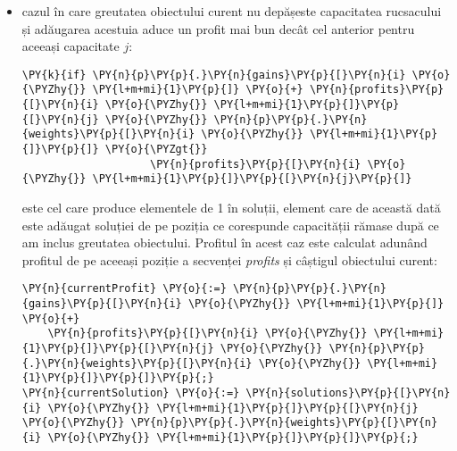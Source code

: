 \begin{sloppypar}
\begin{itemize}
        \begin{Verbatim}[commandchars=\\\{\}]
\PY{n}{currentProfit} \PY{o}{:=} \PY{n}{profits}\PY{p}{[}\PY{n}{i} \PY{o}{\PYZhy{}} \PY{l+m+mi}{1}\PY{p}{]}\PY{p}{[}\PY{n}{j}\PY{p}{]}\PY{p}{;}
\PY{n}{currentSolution} \PY{o}{:=} \PY{n}{solutions}\PY{p}{[}\PY{n}{i} \PY{o}{\PYZhy{}} \PY{l+m+mi}{1}\PY{p}{]}\PY{p}{[}\PY{n}{j}\PY{p}{]}\PY{p}{;}
\PY{n}{currentSolution} \PY{o}{:=} \PY{n}{currentSolution} \PY{o}{+} \PY{p}{[}\PY{l+m+mi}{0}\PY{p}{]}\PY{p}{;}
\end{Verbatim}
        este implementarea din metoda .
        \item cazul în care greutatea obiectului curent nu depășeste capacitatea rucsacului și adăugarea acestuia aduce un profit mai bun decât cel anterior pentru aceeași capacitate $j$:
        \begin{Verbatim}[commandchars=\\\{\}]
 \PY{k}{if} \PY{n}{p}\PY{p}{.}\PY{n}{gains}\PY{p}{[}\PY{n}{i} \PY{o}{\PYZhy{}} \PY{l+m+mi}{1}\PY{p}{]} \PY{o}{+} \PY{n}{profits}\PY{p}{[}\PY{n}{i} \PY{o}{\PYZhy{}} \PY{l+m+mi}{1}\PY{p}{]}\PY{p}{[}\PY{n}{j} \PY{o}{\PYZhy{}} \PY{n}{p}\PY{p}{.}\PY{n}{weights}\PY{p}{[}\PY{n}{i} \PY{o}{\PYZhy{}} \PY{l+m+mi}{1}\PY{p}{]}\PY{p}{]} \PY{o}{\PYZgt{}} 
                    \PY{n}{profits}\PY{p}{[}\PY{n}{i} \PY{o}{\PYZhy{}} \PY{l+m+mi}{1}\PY{p}{]}\PY{p}{[}\PY{n}{j}\PY{p}{]}
\end{Verbatim}
        este cel care produce elementele de 1 în soluții, element care de această dată este adăugat soluției de pe poziția ce corespunde capacității rămase după ce am inclus greutatea obiectului. Profitul în acest caz este calculat adunând profitul de pe aceeași poziție a secvenței \textit{profits} și câștigul obiectului curent:
        \begin{Verbatim}[commandchars=\\\{\}]
\PY{n}{currentProfit} \PY{o}{:=} \PY{n}{p}\PY{p}{.}\PY{n}{gains}\PY{p}{[}\PY{n}{i} \PY{o}{\PYZhy{}} \PY{l+m+mi}{1}\PY{p}{]} \PY{o}{+} 
    \PY{n}{profits}\PY{p}{[}\PY{n}{i} \PY{o}{\PYZhy{}} \PY{l+m+mi}{1}\PY{p}{]}\PY{p}{[}\PY{n}{j} \PY{o}{\PYZhy{}} \PY{n}{p}\PY{p}{.}\PY{n}{weights}\PY{p}{[}\PY{n}{i} \PY{o}{\PYZhy{}} \PY{l+m+mi}{1}\PY{p}{]}\PY{p}{]}\PY{p}{;}
\PY{n}{currentSolution} \PY{o}{:=} \PY{n}{solutions}\PY{p}{[}\PY{n}{i} \PY{o}{\PYZhy{}} \PY{l+m+mi}{1}\PY{p}{]}\PY{p}{[}\PY{n}{j} \PY{o}{\PYZhy{}} \PY{n}{p}\PY{p}{.}\PY{n}{weights}\PY{p}{[}\PY{n}{i} \PY{o}{\PYZhy{}} \PY{l+m+mi}{1}\PY{p}{]}\PY{p}{]}\PY{p}{;}

\end{Verbatim}
\end{itemize}
\end{sloppypar}
